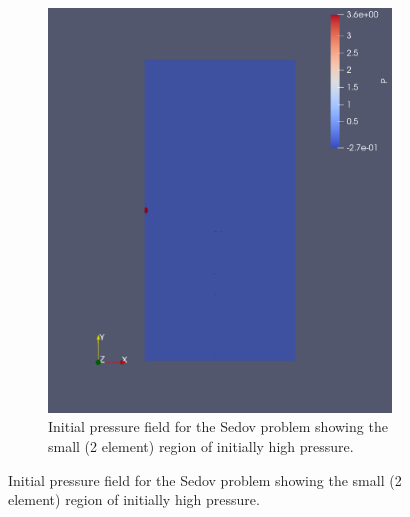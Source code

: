 \begin{figure}[h!]
\centering
\begin{subfigure}[h!]{0.9\linewidth}
\centering
\includegraphics[scale=0.25]{figures/sedov-00-P.pdf }
\caption{Initial pressure field for the Sedov problem showing the small (2 element) region of initially high pressure.\bigskip \bigskip}
  \label{fig:sedov-0}
\end{subfigure}


\end{figure}
